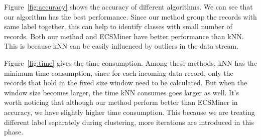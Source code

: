 \documentclass[runningheads]{llncs}
\begin{document}
	Figure~\ref{fig:accuracy} shows the accuracy of different algorithms. We can see that our algorithm has the best performance. Since our method group the records with same label together, this can help to identify classes with small number of records. Both our method and ECSMiner have better performance than kNN. This is because kNN can be easily influenced by outliers in the data stream.
	
	Figure~\ref{fig:time} gives the time consumption. Among these methods, kNN has the minimum time consumption, since for each incoming data record, only the records that hold in the fixed size window need to be calculated. But when the window size becomes larger, the time kNN consumes goes larger as well. It's worth noticing that although our method perform better than ECSMiner in accuracy, we have slightly higher time consumption. This because we are treating different label separately during clustering, more iterations are introduced in this phase.
	
	
\end{document}
